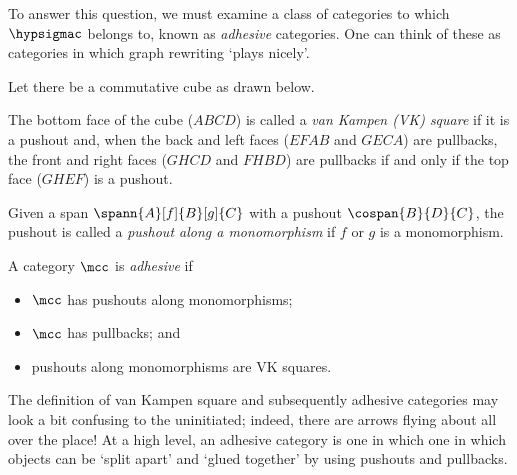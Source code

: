 To answer this question, we must examine a class of categories to which
\(\hypsigmac\) belongs to, known as \emph{adhesive} categories.
One can think of these as categories in which graph rewriting `plays nicely'.

\begin{definition}
    Let there be a commutative cube as drawn below.
    \begin{center}
    \end{center}
    The bottom face of the cube (\(ABCD\)) is called a
    \emph{van Kampen (VK) square} if it is a pushout and, when the back and
    left faces (\(EFAB\) and \(GECA\)) are pullbacks, the front and right faces
    (\(GHCD\) and \(FHBD\)) are pullbacks if and only if the top face (\(GHEF\))
    is a pushout.
\end{definition}

\begin{definition}
    Given a span \(\spann{A}[f]{B}[g]{C}\) with a pushout \(\cospan{B}{D}{C}\),
    the pushout is called a \emph{pushout along a monomorphism} if \(f\) or
    \(g\) is a monomorphism.
\end{definition}

\begin{definition}
    A category \(\mcc\) is \emph{adhesive} if
    \begin{itemize}
        \item \(\mcc\) has pushouts along monomorphisms;
        \item \(\mcc\) has pullbacks; and
        \item pushouts along monomorphisms are VK squares.
    \end{itemize}
\end{definition}

The definition of van Kampen square and subsequently adhesive categories may
look a bit confusing to the uninitiated; indeed, there are arrows flying about
all over the place!
At a high level, an adhesive category is one in which one in which objects can
be `split apart' and `glued together' by using pushouts and pullbacks.

